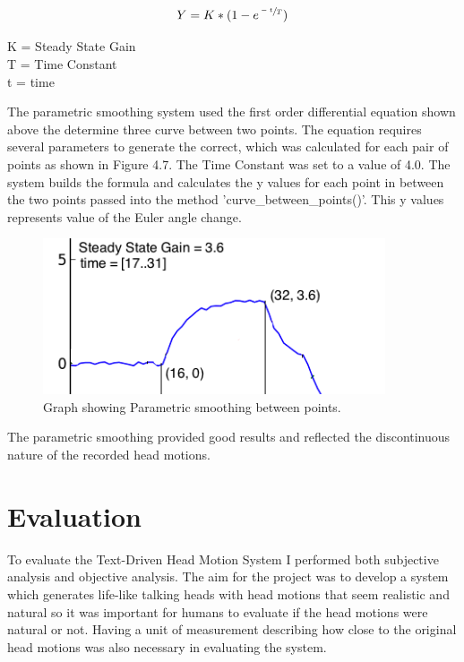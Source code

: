 \documentclass[bsc,frontabs,twoside,singlespacing,parskip,deptreport]{infthesis}
\begin{document}
\begin{equation}
Y =  K * (1 - e^{\sfrac{-t}{T}})
\end{equation}

\begin{centering}
K = Steady State Gain\\
T = Time Constant\\
t = time\\
\end{centering}

The parametric smoothing system used the first order differential equation shown above the determine three curve between two points. The equation requires several parameters to generate the correct, which was calculated for each pair of points as shown in Figure 4.7. The Time Constant was set to a value of 4.0. The system builds the formula and calculates the y values for each point in between the two points passed into the method 'curve\_between\_points()'. This y values represents value of the Euler angle change.

\begin{figure}
	\includegraphics[width=0.9\textwidth]{parametric_ex.png}
	\caption{Graph showing Parametric smoothing between points.}
\end{figure}

The parametric smoothing provided good results and reflected the discontinuous nature of the recorded head motions.

\chapter{Evaluation}

To evaluate the Text-Driven Head Motion System I performed both subjective analysis and objective analysis. The aim for the project was to develop a system which generates life-like talking heads with head motions that seem realistic and natural so it was important for humans to evaluate if the head motions were natural or not. Having a unit of measurement describing how close to the original head motions was also necessary in evaluating the system.
\end{document}
